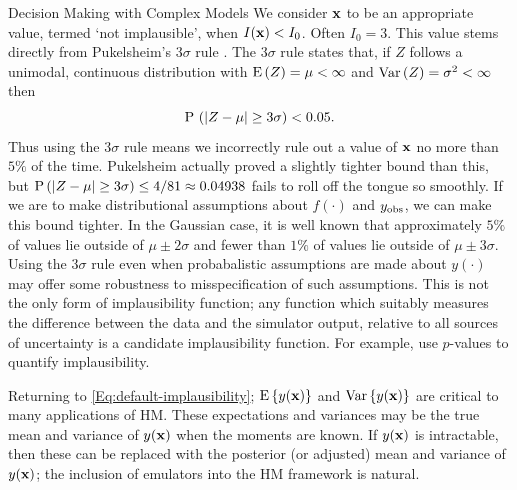 \begin{chapter}{Decision Making with Complex Models \label{Chap:optimisation}}
We consider $\mathbf{x}$ to be an appropriate value, termed `not implausible', when $I(\mathbf{x}) < I_0$. Often $I_0 = 3$. This value stems directly from Pukelsheim's $3\sigma$ rule \citep{Pukelsheim1994}. The $3\sigma$ rule states that, if $Z$ follows a unimodal, continuous distribution with $\textrm{E}\,(Z) = \mu < \infty$ and $\mathrm{Var}\,(Z) = \sigma^2 < \infty$ then
\begin{equation}
 \mathrm{P}\, \left( | Z-\mu | \geq 3\sigma \right) < 0.05. \label{Eq:pukelsheim}
\end{equation}
Thus using the $3\sigma$ rule means we incorrectly rule out a value of $\mathbf{x}$ no more than $5\%$ of the time. Pukelsheim actually proved a slightly tighter bound than this, but $\mathrm{P}\, ( |Z - \mu| \geq 3\sigma ) \leq 4/81 \approx 0.04938$ fails to roll off the tongue so smoothly. If we are to make distributional assumptions about $f(\cdot)$ and $y_{\text{obs}}$, we can make this bound tighter. In the Gaussian case, it is well known that approximately $5\%$ of values lie outside of $\mu \pm 2 \sigma$ and fewer than $1\%$ of values lie outside of $\mu \pm 3\sigma$. Using the $3\sigma$ rule even when probabalistic assumptions are made about $y(\cdot)$ may offer some robustness to misspecification of such assumptions. This is not the only form of implausibility function; any function which suitably measures the difference between the data and the simulator output, relative to all sources of uncertainty is a candidate implausibility function. For example, \citet{Wang2018} use $p$-values to quantify implausibility.

Returning to \cref{Eq:default-implausibility}; $\textrm{E}\,\{y(\mathbf{x})\}$ and $\mathrm{Var}\, \{ y(\mathbf{x}) \} $ are critical to many applications of HM. These expectations and variances may be the true mean and variance of $y(\mathbf{x})$ when the moments are known. If $y(\mathbf{x})$ is intractable, then these can be replaced with the posterior (or adjusted) mean and variance of $y(\mathbf{x})$; the inclusion of emulators into the HM framework is natural.


\end{chapter}
